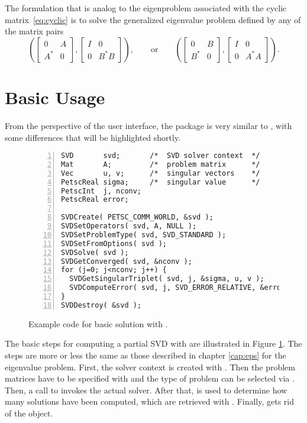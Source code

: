 The formulation that is analog to the eigenproblem associated with the cyclic matrix~\eqref{eq:cyclic} is to solve the generalized eigenvalue problem defined by any of the matrix pairs
\begin{equation}
\label{eq:gsvdeigcyclic}
\left(
\begin{bmatrix}0&A\\A^*&0\end{bmatrix},
\begin{bmatrix}I&0\\0&B^*B\end{bmatrix}
\right),
\qquad\text{or}\qquad
\left(
\begin{bmatrix}0&B\\B^*&0\end{bmatrix},
\begin{bmatrix}I&0\\0&A^*A\end{bmatrix}
\right).
\end{equation}

\section{Basic Usage}

From the perspective of the user interface, the  package is very similar to , with some differences that will be highlighted shortly.

\begin{figure}
\begin{Verbatim}[fontsize=\small,numbers=left,numbersep=6pt,xleftmargin=15mm]
SVD       svd;       /*  SVD solver context  */
Mat       A;         /*  problem matrix      */
Vec       u, v;      /*  singular vectors    */
PetscReal sigma;     /*  singular value      */
PetscInt  j, nconv;
PetscReal error;

SVDCreate( PETSC_COMM_WORLD, &svd );
SVDSetOperators( svd, A, NULL );
SVDSetProblemType( svd, SVD_STANDARD );
SVDSetFromOptions( svd );
SVDSolve( svd );
SVDGetConverged( svd, &nconv );
for (j=0; j<nconv; j++) {
  SVDGetSingularTriplet( svd, j, &sigma, u, v );
  SVDComputeError( svd, j, SVD_ERROR_RELATIVE, &error );
}
SVDDestroy( &svd );
\end{Verbatim}
\caption{\label{fig:ex-svd}Example code for basic solution with .}
\end{figure}

The basic steps for computing a partial SVD with \slepc are illustrated in Figure \ref{fig:ex-svd}. The steps are more or less the same as those described in chapter \ref{cap:eps} for the eigenvalue problem. First, the solver context is created with . Then the problem matrices have to be specified with  and the type of problem can be selected via . Then, a call to  invokes the actual solver. After that,  is used to determine how many solutions have been computed, which are retrieved with . Finally,  gets rid of the object.

